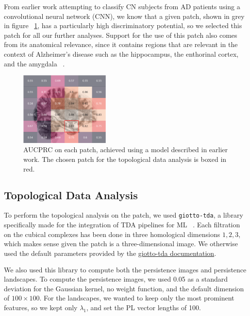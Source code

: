 \documentclass{article}
\begin{document}
From earlier work attempting to classify CN subjects from AD patients using a convolutional neural network (CNN), we know that a given patch, shown in grey in figure ~\ref{fig:aucprc}, has a particularly high discriminatory potential, so we selected this patch for all our further analyses. Support for the use of this patch also comes from its anatomical relevance, since it contains regions that are relevant in the context of Alzheimer's disease such as the hippocampus, the enthorinal cortex, and the amygdala ~\citep{goedert2006century}.

\begin{figure}
  \centering
  \includegraphics[width=0.4\textwidth]{figures/patch_performance.png}
  \caption{AUCPRC on each patch, achieved using a model described in earlier work. The chosen patch for the topological data analysis is boxed in red.}
  \label{fig:aucprc}
\end{figure}

\subsection{Topological Data Analysis}\label{sec:tda_setup}

To perform the topological analysis on the patch, we used \texttt{giotto-tda}, a library specifically made for the integration of TDA pipelines for ML ~\citep{tauzin2020giottotda}. Each filtration on the cubical complexes has been done in three homological dimensions $1,2,3$, which makes sense given the patch is a three-dimensional image. We otherwise used the default parameters provided by the \href{https://giotto-ai.github.io/gtda-docs/latest/modules/generated/homology/gtda.homology.CubicalPersistence.html#id2}{giotto-tda documentation}.

We also used this library to compute both the persistence images and persistence landscapes. To compute the persistence images, we used 0.05 as a standard deviation for the Gaussian kernel, no weight function, and the default dimension of $100 \times 100$. For the landscapes, we wanted to keep only the most prominent features, so we kept only $\lambda_1$, and set the PL vector lengths of 100.
\end{document}
